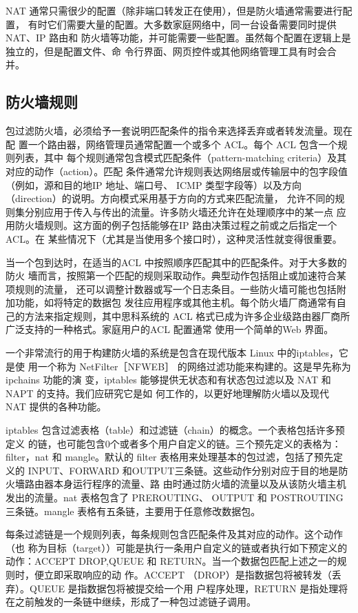 NAT 通常只需很少的配置（除非端口转发正在使用），但是防火墙通常需要进行配置，
有时它们需要大量的配置。大多数家庭网络中，同一台设备需要同时提供NAT、IP 路由和
防火墙等功能，并可能需要一些配置。虽然每个配置在逻辑上是独立的，但是配置文件、命
令行界面、网页控件或其他网络管理工具有时会合并。

\subsection{防火墙规则}

包过滤防火墙，必须给予一套说明匹配条件的指令来选择丢弃或者转发流量。现在配
置一个路由器，网络管理员通常配置一个或多个 ACL。每个 ACL 包含一个规则列表，其中
每个规则通常包含模式匹配条件（pattern-matching criteria）及其对应的动作（action）。匹配
条件通常允许规则表达网络层或传输层中的包字段值（例如，源和目的地IP 地址、端口号、
ICMP 类型字段等）以及方向（direction）的说明。方向模式采用基于方向的方式来匹配流量，
允许不同的规则集分别应用于传入与传出的流量。许多防火墙还允许在处理顺序中的某一点
应用防火墙规则。这方面的例子包括能够在IP 路由决策过程之前或之后指定一个ACL。在
某些情况下（尤其是当使用多个接口时），这种灵活性就变得很重要。

当一个包到达时，在适当的ACL 中按照顺序匹配其中的匹配条件。对于大多数的防火
墻而言，按照第一个匹配的规则采取动作。典型动作包括阻止或加速符合某项规则的流量，
还可以调整计数器或写一个日志条目。一些防火墙可能也包括附加功能，如将特定的数据包
发往应用程序或其他主机。每个防火墙厂商通常有自己的方法来指定规则，其中思科系统的
ACL 格式已成为许多企业级路由器厂商所广泛支持的一种格式。家庭用户的ACL 配置通常
使用一个简单的Web 界面。

一个非常流行的用于构建防火墙的系统是包含在现代版本 Linux 中的iptables，它是使
用一个称为 NetFilter［NFWEB］ 的网络过滤功能来构建的。这是早先称为 ipchains 功能的演
变，iptables 能够提供无状态和有状态包过滤以及 NAT 和 NAPT 的支持。我们应研究它是如
何工作的，以更好地理解防火墙以及现代 NAT 提供的各种功能。

iptables 包含过滤表格（table）和过滤链（chain）的概念。一个表格包括许多预定义
的链，也可能包含0个或者多个用户自定义的链。三个预先定义的表格为：filter，nat 和
mangle。默认的 filter 表格用来处理基本的包过滤，包括了预先定义的 INPUT、FORWARD
和OUTPUT三条链。这些动作分别对应于目的地是防火墻路由器本身运行程序的流量、路
由时通过防火墙的流量以及从该防火墙主机发出的流量。nat 表格包含了 PREROUTING、
OUTPUT 和 POSTROUTING三条链。mangle 表格有五条链，主要用于任意修改数据包。

每条过滤链是一个规则列表，每条规则包含匹配条件及其对应的动作。这个动作（也
称为目标（target））可能是执行一条用户自定义的链或者执行如下预定义的动作：ACCEPT
DROP,QUEUE 和 RETURN。当一个数据包匹配上述之一的规则时，便立即采取响应的动
作。ACCEPT （DROP）是指数据包将被转发（丢弃）。QUEUE 是指数据包将被提交给一个用
户程序处理，RETURN 是指处理将在之前触发的一条链中继续，形成了一种包过滤链子调用。

